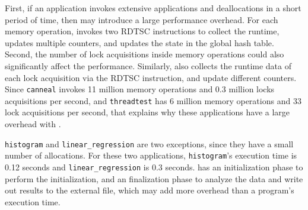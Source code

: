 First, if an application invokes extensive applications and deallocations in a short period of time, then \MP{} may introduce a large performance overhead. For each memory operation, \MP{} invokes two RDTSC instructions to collect the runtime, updates multiple counters, and updates the state in the global hash table. Second, the number of lock acquisitions inside memory operations could also significantly affect the performance. Similarly, \MP{} also collects the runtime data of each lock acquisition via the RDTSC instruction, and update different counters. 
Since \texttt{canneal} invokes 11 million memory operations and 0.3 million locks acquisitions per second, and \texttt{threadtest} has 6 million memory operations and 33 lock acquisitions per second, that explains why these applications have a large overhead with \MP{}.  

\texttt{histogram} and \texttt{linear\_regression} are two exceptions, since they have a small number of allocations. For these two applications, \texttt{histogram}'s execution time is 0.12 seconds and \texttt{linear\_regression} is 0.3 seconds. \MP{} has an initialization phase to perform the initialization, and an finalization phase to analyze the data and write out results to the external file, which may add more overhead than a program's execution time. 

